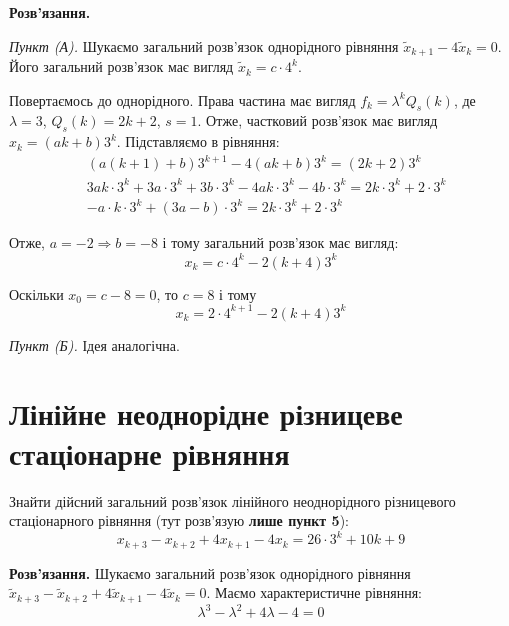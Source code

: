 \documentclass{hw_template}
\begin{document}
\textbf{Розв'язання.}

\textit{Пункт (А).} Шукаємо загальний розв'язок однорідного рівняння $\widetilde{x}_{k+1}-4\widetilde{x}_k=0$. Його загальний розв'язок має вигляд $\widetilde{x}_k = c\cdot 4^k$. 

Повертаємось до однорідного. Права частина має вигляд $f_k = \lambda^k Q_s(k)$, де $\lambda=3$, $Q_s(k)=2k+2$, $s=1$. Отже, частковий розв'язок має вигляд $x_k = (ak+b)3^k$. Підставляємо в рівняння:
\begin{align*}
    &(a(k+1)+b)3^{k+1} - 4(ak+b)3^k = (2k+2)3^k \\
    &3ak \cdot 3^{k}+ 3a \cdot 3^k + 3b \cdot 3^{k} - 4ak \cdot 3^k - 4b \cdot 3^k = 2k \cdot 3^k + 2 \cdot 3^k \\
    &-a \cdot k \cdot 3^k + (3a-b) \cdot 3^k = 2k \cdot 3^k + 2 \cdot 3^k
\end{align*}

Отже, $a=-2 \Rightarrow b=-8$ і тому загальний розв'язок має вигляд:
\begin{equation*}
    x_k = c \cdot 4^k - 2(k+4)3^k
\end{equation*}

Оскільки $x_0=c-8=0$, то $c=8$ і тому
\begin{equation*}
    x_k = 2 \cdot 4^{k+1} - 2(k+4)3^k
\end{equation*}

\textit{Пункт (Б).} Ідея аналогічна.

\pagebreak

\section{Лінійне неоднорідне різницеве стаціонарне рівняння}

\begin{problem}
    Знайти дійсний загальний розв’язок лінійного неоднорідного різницевого стаціонарного рівняння (тут розв'язую \textbf{лише пункт 5}):
    \begin{equation*}
        x_{k+3} - x_{k+2} + 4x_{k+1} - 4x_k = 26 \cdot 3^k + 10k + 9
    \end{equation*}
\end{problem}

\textbf{Розв'язання.} Шукаємо загальний розв'язок однорідного рівняння $\widetilde{x}_{k+3}-\widetilde{x}_{k+2}+4\widetilde{x}_{k+1}-4\widetilde{x}_k=0$. Маємо характеристичне рівняння:
\begin{equation*}
    \lambda^3 - \lambda^2 + 4\lambda - 4 = 0
\end{equation*}
\end{document}

